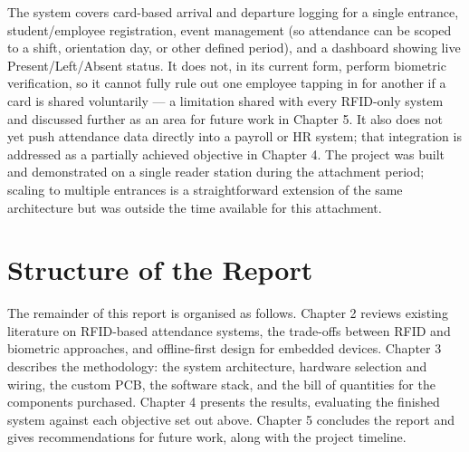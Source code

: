 The system covers card-based arrival and departure logging for a single entrance, student/employee registration, event management (so attendance can be scoped to a shift, orientation day, or other defined period), and a dashboard showing live Present/Left/Absent status. It does not, in its current form, perform biometric verification, so it cannot fully rule out one employee tapping in for another if a card is shared voluntarily — a limitation shared with every RFID-only system and discussed further as an area for future work in Chapter 5. It also does not yet push attendance data directly into a payroll or HR system; that integration is addressed as a partially achieved objective in Chapter 4. The project was built and demonstrated on a single reader station during the attachment period; scaling to multiple entrances is a straightforward extension of the same architecture but was outside the time available for this attachment.

\section{Structure of the Report}

The remainder of this report is organised as follows. Chapter 2 reviews existing literature on RFID-based attendance systems, the trade-offs between RFID and biometric approaches, and offline-first design for embedded devices. Chapter 3 describes the methodology: the system architecture, hardware selection and wiring, the custom PCB, the software stack, and the bill of quantities for the components purchased. Chapter 4 presents the results, evaluating the finished system against each objective set out above. Chapter 5 concludes the report and gives recommendations for future work, along with the project timeline.
